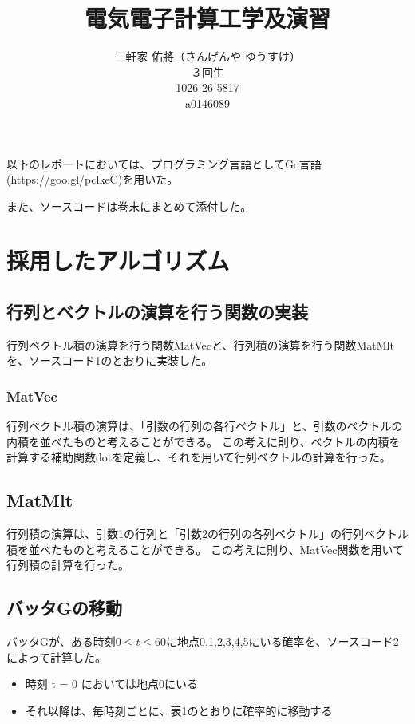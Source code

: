 \documentclass[11pt]{ltjsarticle}
\title{電気電子計算工学及演習}
\author{三軒家 佑將（さんげんや ゆうすけ） \\ ３回生 \\ 1026-26-5817 \\ a0146089}
\date{}
\begin{document}
\maketitle


以下のレポートにおいては、プログラミング言語としてGo言語(https://goo.gl/pclkeC)を用いた。

また、ソースコードは巻末にまとめて添付した。

\section{採用したアルゴリズム}
\subsection{行列とベクトルの演算を行う関数の実装}
	行列ベクトル積の演算を行う関数MatVecと、行列積の演算を行う関数MatMltを、ソースコード1のとおりに実装した。
	\subsubsection*{MatVec}
		行列ベクトル積の演算は、「引数の行列の各行ベクトル」と、引数のベクトルの内積を並べたものと考えることができる。
		この考えに則り、ベクトルの内積を計算する補助関数dotを定義し、それを用いて行列ベクトルの計算を行った。
	\subsection*{MatMlt}
		行列積の演算は、引数1の行列と「引数2の行列の各列ベクトル」の行列ベクトル積を並べたものと考えることができる。
		この考えに則り、MatVec関数を用いて行列積の計算を行った。

\subsection{バッタGの移動}
	バッタGが、ある時刻$0 \leq t \leq 60$に地点0,1,2,3,4,5にいる確率を、ソースコード2によって計算した。

	\begin{itemize}
		\item 時刻 t = 0 においては地点0にいる
		\item それ以降は、毎時刻ごとに、表1のとおりに確率的に移動する
	\end{itemize}
\end{document}
